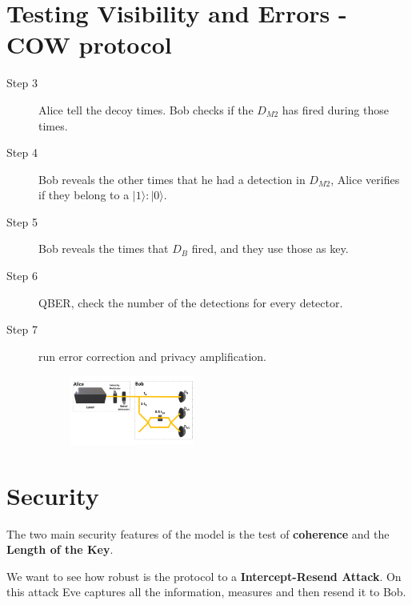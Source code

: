 \documentclass[1000pt]{article}
\newcommand{\mysection}[1]{\section*{\color{black}\sffamily #1}}%
\begin{document}

\mysection{\Huge\textbf{Testing Visibility and Errors - COW protocol}} \Large \vspace*{1cm}
\begin{description}

\item [Step 3] Alice tell the decoy times. Bob checks if the $D_{M2}$ has fired during those times.

\item [Step 4] Bob reveals the other times that he had a detection in $D_{M2}$, Alice verifies if they belong to a $|1\rangle:|0\rangle$.

\item [Step 5] Bob reveals the times that $D_B$ fired, and they use those as key.

\item [Step 6] QBER, check the number of the detections for every detector.

\item [Step 7] run error correction and privacy amplification.

\begin{figure}[hbt]
    	\centering
    	\includegraphics[width=0.4\textwidth]{./figures/Full2.pdf}
    \end{figure}
\end{description}
\mysection{\Huge\textbf{Security}} \Large \vspace*{1cm}
\begin{description}
\item The two main security features of the model is the test of \textbf{coherence} and the \textbf{Length of the Key}.

\item We want to see how robust is the protocol to a \textbf{Intercept-Resend Attack}. On this attack Eve captures all the information, measures and then resend it to Bob.
\end{description}
\end{document}
